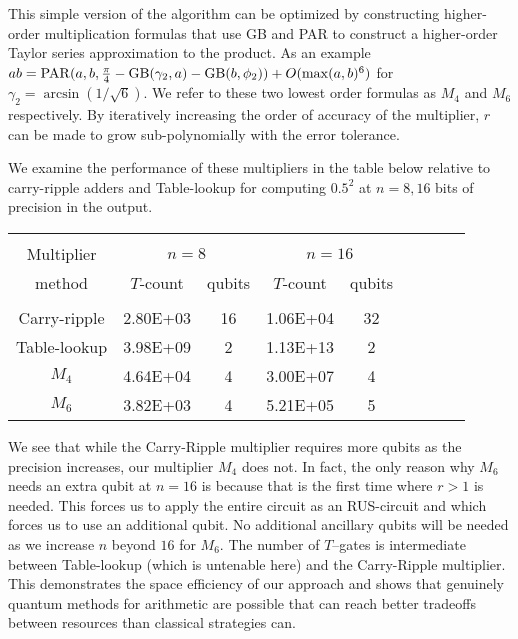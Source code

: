 \documentclass[conference]{IEEEtran}
\begin{document}
This simple version of the algorithm can be optimized by constructing higher-order multiplication formulas that use GB and PAR to construct a higher-order Taylor series approximation to the product.  As an example ${ab=\rm PAR}(a,b,\frac{\pi}{4}- {\rm GB}(\gamma_2,a)-{\rm GB}(b,\phi_2))+ O(\max(a,b)^6)$ for $\gamma_2 =\arcsin(1/\sqrt{6})$.  We refer to these two lowest order formulas as $M_4$ and $M_6$ respectively.  By iteratively increasing the order of accuracy of the multiplier, $r$ can be made to grow sub-polynomially with the error tolerance.

We examine the performance of these multipliers in the table below relative to carry-ripple adders and Table-lookup for computing $0.5^2$ at $n=8,16$ bits of precision in the output.
\begin{table}[h!]
\centering
\footnotesize
\begin{tabular}{c@{\qquad}c@{\quad}c@{\qquad}c@{\quad}c@{\qquad}c@{\quad}c@{\qquad}c@{\quad}c}
\hline\\
Multiplier & \multicolumn{2}{c}{$n=8$\phantom{111}} & \multicolumn{2}{c}{$n=16$} \\[0.5ex]
method      & $T$-count & qubits & $T$-count & qubits \\[1.5ex]
\hline\\
Carry-ripple & 2.80E+03 & 16 & 1.06E+04  &32\\[1.5ex]
Table-lookup  & 3.98E+09 & 2 & 1.13E+13& 2\\[1.5ex]
$M_4$  &4.64E+04 &4 &3.00E+07 &4 \\[1.5ex] 
$M_6$  &3.82E+03 &4 & 5.21E+05&5 \\[1.5ex] 
\hline
\end{tabular}
\end{table}

We see that while the Carry-Ripple multiplier requires more qubits as the precision increases, our multiplier $M_4$ does not.  In fact, the only reason why $M_6$ needs an extra qubit at $n=16$ is because that is the first time where $r>1$ is needed.  This forces us to apply the entire circuit as an RUS-circuit and which forces us to use an additional qubit.  No additional ancillary qubits will be needed as we increase $n$ beyond $16$ for $M_6$.  The number of $T$--gates is intermediate between Table-lookup (which is untenable here) and the Carry-Ripple multiplier.  This demonstrates the space efficiency of our approach and shows that genuinely quantum methods for arithmetic are possible that can reach better tradeoffs between resources than classical strategies can.
\end{document}
